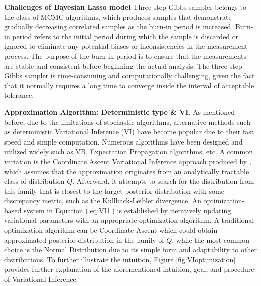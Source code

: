 \textbf{Challenges of Bayesian Lasso model}
Three-step Gibbs sampler belongs to the class of MCMC algorithms, which produces samples that demonstrate gradually decreasing correlated samples as the burn-in period is increased. Burn-in period refers to the initial period during which the sample is discarded or ignored to eliminate any potential biases or inconsistencies in the measurement process. The purpose of the burn-in period is to ensure that the measurements are stable and consistent before beginning the actual analysis. The three-step Gibbs sampler is time-consuming and computationally challenging, given the fact that it normally requires a long time to converge inside the interval of acceptable tolerance.

\textbf{Approximation Algorithm: Deterministic type \& VI}.
As mentioned before, due to the limitations of stochastic algorithms, alternative methods such as deterministic Variational Inference (VI) have become popular due to their fast speed and simple computation.
Numerous algorithms have been designed and utilized widely such as VB, Expectation Propagation algorithms, etc. A common variation is the Coordinate Ascent Variational Inference approach produced by \cite{Blei2003LDA}, which assumes that the approximation originates from an analytically tractable class of distribution $Q$. Afterward, it attempts to search for the distribution from this family that is closest to the target posterior distribution with some discrepancy metric, such as the Kullback-Leibler divergence. An optimization-based system in Equation (\ref{eq:VI1}) is established by iteratively updating variational parameters with an appropriate optimization algorithm. A traditional optimization algorithm can be Coordinate Ascent which could obtain approximated posterior distribution in the family of $Q$, while the most common choice is the Normal Distribution due to its simple form and adaptability to other distributions.
To further illustrate the intuition, Figure \ref{fig:VIoptimization} provides further explanation of the aforementioned intuition, goal, and procedure of Variational Inference.

